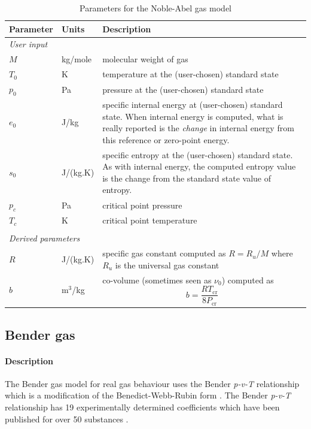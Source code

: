 \begin{table}[h]
\caption{Parameters for the Noble-Abel gas model}
\label{tab:na-params}
\begin{tabular}{llp{10cm}}
\toprule
Parameter & Units & Description \\ \midrule
\multicolumn{3}{l}{\textit{User input}} \\
$M$       & kg/mole & molecular weight of gas \\
$T_0$     & K      & temperature at the (user-chosen) standard state \\
$p_0$     & Pa     & pressure at the (user-chosen) standard state \\
$e_0$     & J/kg   & specific internal energy at (user-chosen) standard state.
                    When internal energy is computed, what is really 
                    reported is the \emph{change} in internal energy
                    from this reference or zero-point energy. \\
$s_0$     & J/(kg.K) & specific entropy at the (user-chosen) standard state.
                       As with internal energy, the computed entropy value
                       is the change from the standard state value of entropy. \\
$p_c$     & Pa     & critical point pressure \\
$T_c$     & K      & critical point temperature \\
 & & \\
\multicolumn{3}{l}{\textit{Derived parameters}} \\
$R$      & J/(kg.K) & specific gas constant computed as $R = R_u/M$ where
                      $R_u$ is the universal gas constant \\
$b$      & m$^3$/kg & co-volume (sometimes seen as $\nu_0$) computed as
                      \[ b = \frac{R T_{\text{cr}}}{8 P_{\text{cr}}} \] \\

\bottomrule
\end{tabular}
\end{table}

\subsection{Bender gas}
\label{sec:bender_gas}

\paragraph{Description}
The Bender gas model for real gas behaviour uses the Bender \cite{bender1975equations}
\textit{p-v-T} relationship which is a modification of the Benedict-Webb-Rubin
form \cite{sengers2000equations}.
The Bender \textit{p-v-T} relationship has 19 experimentally determined coefficients
which have been published for over 50 substances
\cite{bender1970equations,bender1975equations,platzer1990thermophysical,polt1992bender,sievers1980equation}.

